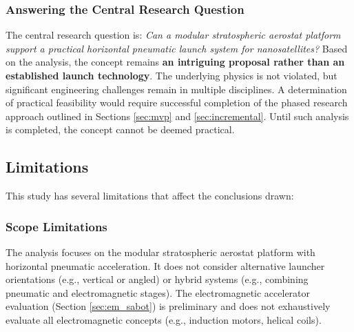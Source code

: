 \subsubsection{Answering the Central Research Question}
The central research question is: \emph{Can a modular stratospheric aerostat platform support a practical horizontal pneumatic launch system for nanosatellites?} Based on the analysis, the concept remains \textbf{an intriguing proposal rather than an established launch technology}. The underlying physics is not violated, but significant engineering challenges remain in multiple disciplines. A determination of practical feasibility would require successful completion of the phased research approach outlined in Sections \ref{sec:mvp} and \ref{sec:incremental}. Until such analysis is completed, the concept cannot be deemed practical.

\subsection{Limitations}
This study has several limitations that affect the conclusions drawn:

\subsubsection{Scope Limitations}
The analysis focuses on the modular stratospheric aerostat platform with horizontal pneumatic acceleration. It does not consider alternative launcher orientations (e.g., vertical or angled) or hybrid systems (e.g., combining pneumatic and electromagnetic stages). The electromagnetic accelerator evaluation (Section \ref{sec:em_sabot}) is preliminary and does not exhaustively evaluate all electromagnetic concepts (e.g., induction motors, helical coils).


